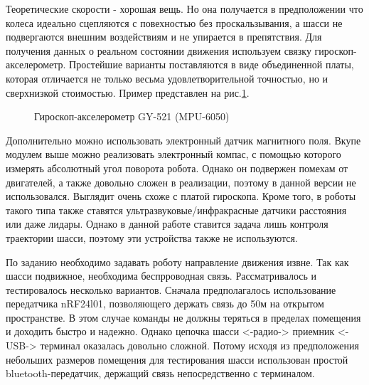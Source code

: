 \documentclass[14pt,a4paper,russian]{scrartcl}
\begin{document}
Теоретические скорости - хорошая вещь. Но она получается в предположении
что колеса идеально сцепляются с повехностью без проскальзывания, 
а шасси не подвергаются внешним воздействиям и не упирается в препятствия.
Для получения данных о реальном состоянии движения используем связку 
гироскоп-акселерометр. Простейшие варианты поставляются в виде объединенной
платы, которая отличается не только весьма удовлетворительной точностью, но
и сверхнизкой стоимостью. Пример представлен на рис.\ref{fig:gyro_accel}.
\begin{figure}[h]
    \caption{Гироскоп-акселерометр GY-521 (MPU-6050)}
    \label{fig:gyro_accel}
\end{figure}

Дополнительно можно использовать электронный датчик магнитного поля.
Вкупе модулем выше можно реализовать электронный компас, с помощью которого
измерять абсолютный угол поворота робота. Однако он подвержен помехам от 
двигателей, а также довольно сложен в реализации, поэтому в данной версии
не использовался. Выглядит очень схоже с платой гироскопа. Кроме того,
в роботы такого типа также ставятся ультразвуковые/инфракрасные датчики расстояния
или даже лидары. Однако в данной работе ставится задача лишь контроля
траектории шасси, поэтому эти устройства также не используются.

По заданию необходимо задавать роботу направление движения извне. Так как
шасси подвижное, необходима беспрроводная связь. Рассматривалось
и тестировалось несколько вариантов. Сначала предполагалось использование 
передатчика nRF24l01, позволяющего держать связь до 50м на открытом пространстве.
В этом случае команды не должны теряться в пределах помещения и доходить
быстро и надежно. Однако цепочка шасси <-радио-> приемник <-USB-> терминал
оказалась довольно сложной. Потому исходя из предположения небольших
размеров помещения для тестирования шасси использован простой bluetooth-передатчик,
держащий связь непосредственно с терминалом.
\end{document}
